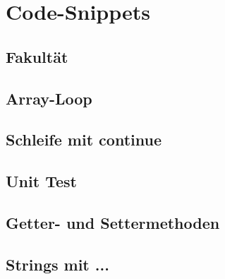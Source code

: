 \section{Code-Snippets}

\subsection{Fakultät}
    

\subsection{Array-Loop}{\label{Array-Loop}}
    

\subsection{Schleife mit continue}

\subsection{Unit Test}{\label{Unit-Test}}

\subsection{Getter- und Settermethoden}{\label{GetSet}}

\subsection{Strings mit ...}

